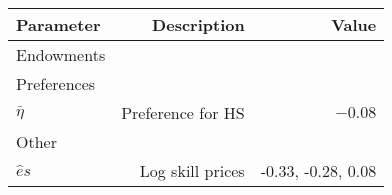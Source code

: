 \begin{tabular}{lrr}
\hline
Parameter & Description  & Value  \\
\hline
Endowments &   &   \\
Preferences &   &   \\
$\bar{\eta}$ & Preference for HS  & $-0.08$  \\
Other &   &   \\
$\hat{e}{s}$ & Log skill prices  & -0.33, -0.28, 0.08  \\
\hline
\end{tabular}%
